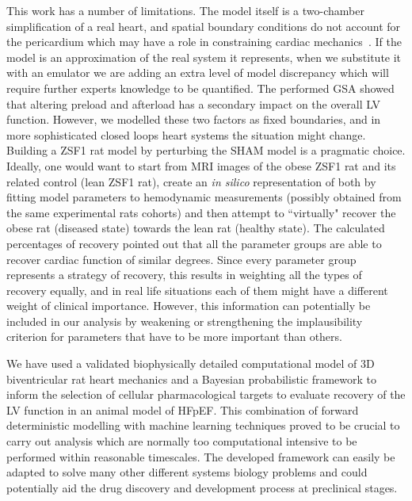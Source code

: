 \noindent
This work has a number of limitations. The model itself is a two-chamber simplification of a real heart, and spatial boundary conditions do not account for the pericardium which may have a role in constraining cardiac mechanics~\cite{Strocchi:2020}. If the model is an approximation of the real system it represents, when we substitute it with an emulator we are adding an extra level of model discrepancy which will require further experts knowledge to be quantified. The performed GSA showed that altering preload and afterload has a secondary impact on the overall LV function. However, we modelled these two factors as fixed boundaries, and in more sophisticated closed loops heart systems the situation might change. Building a ZSF1 rat model by perturbing the SHAM model is a pragmatic choice. Ideally, one would want to start from MRI images of the obese ZSF1 rat and its related control (lean ZSF1 rat), create an \textit{in silico} representation of both by fitting model parameters to hemodynamic measurements (possibly obtained from the same experimental rats cohorts) and then attempt to ``virtually" recover the obese rat (diseased state) towards the lean rat (healthy state). The calculated percentages of recovery pointed out that all the parameter groups are able to recover cardiac function of similar degrees. Since every parameter group represents a strategy of recovery, this results in weighting all the types of recovery equally, and in real life situations each of them might have a different weight of clinical importance. However, this information can potentially be included in our analysis by weakening or strengthening the implausibility criterion for parameters that have to be more important than others.

\vspace{0.2cm}\noindent
{}

\noindent
We have used a validated biophysically detailed computational model of $3$D biventricular rat heart mechanics and a Bayesian probabilistic framework to inform the selection of cellular pharmacological targets to evaluate recovery of the LV function in an animal model of HFpEF. This combination of forward deterministic modelling with machine learning techniques proved to be crucial to carry out analysis which are normally too computational intensive to be performed within reasonable timescales. The developed framework can easily be adapted to solve many other different systems biology problems and could potentially aid the drug discovery and development process at preclinical stages.